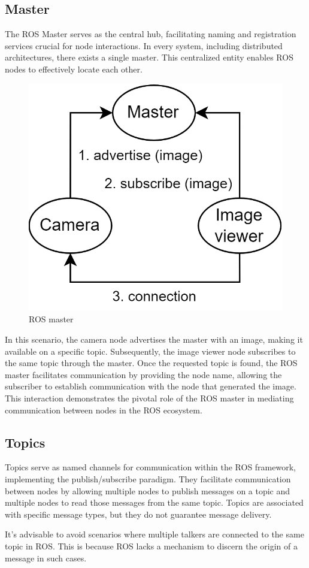 \subsection{Master}
The ROS Master serves as the central hub, facilitating naming and registration services crucial for node interactions. 
In every system, including distributed architectures, there exists a single master.
This centralized entity enables ROS nodes to effectively locate each other.
\begin{figure}[H]
    \centering
    \includegraphics[width=0.5\linewidth]{images/master.png}
    \caption{ROS master}
\end{figure}
In this scenario, the camera node advertises the master with an image, making it available on a specific topic. 
Subsequently, the image viewer node subscribes to the same topic through the master.
Once the requested topic is found, the ROS master facilitates communication by providing the node name, allowing the subscriber to establish communication with the node that generated the image. 
This interaction demonstrates the pivotal role of the ROS master in mediating communication between nodes in the ROS ecosystem.

\subsection{Topics}
Topics serve as named channels for communication within the ROS framework, implementing the publish/subscribe paradigm. 
They facilitate communication between nodes by allowing multiple nodes to publish messages on a topic and multiple nodes to read those messages from the same topic. 
Topics are associated with specific message types, but they do not guarantee message delivery.

It's advisable to avoid scenarios where multiple talkers are connected to the same topic in ROS.\@
This is because ROS lacks a mechanism to discern the origin of a message in such cases.

